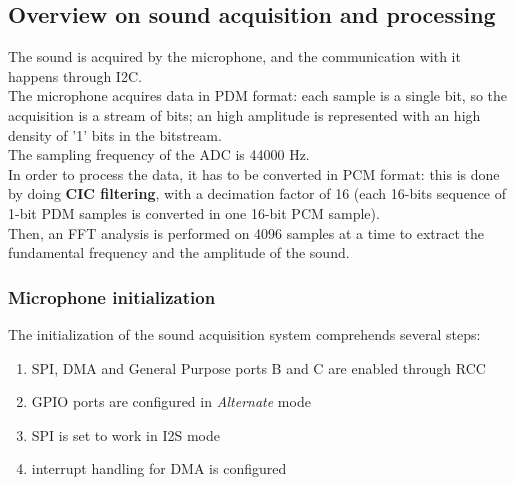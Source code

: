 \subsection{Overview on sound acquisition and processing}
The sound is acquired by the microphone, and the communication with it happens through I2C.\\
The microphone acquires data in PDM format: each sample is a single bit, so the acquisition is a stream of bits; an high amplitude is represented with an high density of '1' bits in the bitstream. \\
The sampling frequency of the ADC is 44000 Hz. \\
In order to process the data, it has to be converted in PCM format: this is done by doing \textbf{CIC filtering}, with a decimation factor of 16 (each 16-bits sequence of 1-bit PDM samples is converted in one 16-bit PCM sample).\\
Then, an FFT analysis is performed on 4096 samples at a time to extract the fundamental frequency and the amplitude of the sound.

\subsubsection{Microphone initialization}
The initialization of the sound acquisition system comprehends several steps:
\begin{enumerate}
	\item SPI, DMA and General Purpose ports B and C are enabled through RCC
	\item GPIO ports are configured in \textit{Alternate} mode
	\item SPI is set to work in I2S mode
	\item interrupt handling for DMA is configured
	
\end{enumerate}

